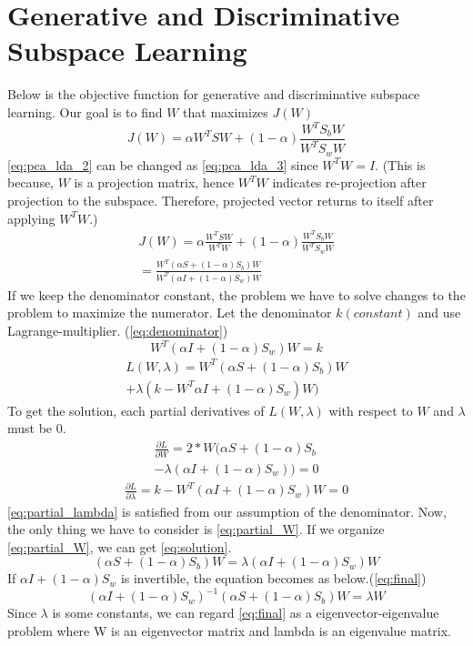 \section{Generative and Discriminative Subspace Learning}
\label{sec:intro}
Below is the objective function for generative and discriminative subspace learning. Our goal is to find $W$ that maximizes $J(W)$
\begin{equation}
  J(W) = \alpha W^TSW+(1-\alpha) \frac{W^TS_bW}{W^TS_wW}
  \label{eq:pca_lda_2}
\end{equation}
\cref{eq:pca_lda_2} can be changed as \cref{eq:pca_lda_3} since $W^TW=I$. (This is because, $W$ is a projection matrix, hence $W^TW$ indicates re-projection after projection to the subspace. Therefore, projected vector returns to itself after applying $W^TW$.)
\begin{multline}
  J(W) = \alpha \frac{W^TSW}{W^TW}+(1-\alpha) \frac{W^TS_bW}{W^TS_wW} \\
  = \frac{W^T(\alpha S + (1-\alpha)S_b)W}{W^T(\alpha I + (1-\alpha)S_w)W}
  \label{eq:pca_lda_3}
\end{multline}
If we keep the denominator constant, the problem we have to solve changes to the problem to maximize the numerator. Let the denominator $k(constant)$ and use Lagrange-multiplier. (\cref{eq:denominator})
\begin{equation}
  W^T(\alpha I + (1-\alpha)S_w)W = k
  \label{eq:denominator}
\end{equation}
\begin{multline}
  L(W,\lambda)=W^T(\alpha S + (1-\alpha)S_b)W \\
  + \lambda(k-W^T\alpha I + (1-\alpha)S_w)W)
  \label{eq:lagrange}
\end{multline}
To get the solution, each partial derivatives of $L(W,\lambda)$ with respect to $W$ and $\lambda$ must be 0.
\begin{multline}
  \frac{\partial L}{\partial W} = 2*W(\alpha S+(1-\alpha)S_b \\
  -\lambda(\alpha I+(1-\alpha)S_w))=0
  \label{eq:partial_W}
\end{multline}
\begin{multline}
  \frac{\partial L}{\partial \lambda} = k - W^T(\alpha I+(1-\alpha)S_w)W=0
  \label{eq:partial_lambda}
\end{multline}
\cref{eq:partial_lambda} is satisfied from our assumption of the denominator. Now, the only thing we have to consider is \cref{eq:partial_W}. If we organize \cref{eq:partial_W}, we can get \cref{eq:solution}.
\begin{equation}
  (\alpha S+(1-\alpha)S_b)W = \lambda (\alpha I + (1-\alpha)S_w)W
  \label{eq:solution}
\end{equation}
If $\alpha I + (1-\alpha)S_w$ is invertible, the equation becomes as below.(\cref{eq:final})
\begin{equation}
  (\alpha I + (1-\alpha)S_w)^{-1}(\alpha S+(1-\alpha)S_b)W = \lambda W
  \label{eq:final}
\end{equation}
Since $\lambda$ is some constants, we can regard \cref{eq:final} as a eigenvector-eigenvalue problem where W is an eigenvector matrix and lambda is an eigenvalue matrix.

